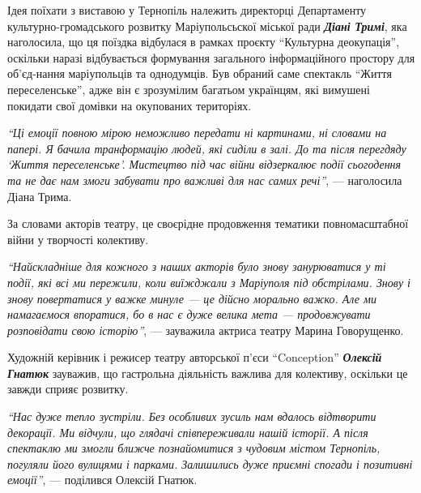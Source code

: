 Ідея поїхати з виставою у Тернопіль належить директорці Департаменту
культурно-громадського розвитку Маріупольсьскої міської ради \emph{\textbf{Діані Тримі}}, яка
наголосила, що ця поїздка відбулася в рамках проєкту \enquote{Культурна деокупація},
оскільки наразі відбувається формування загального інформаційного простору для
об'єд\hyp{}нання маріупольців та однодумців. Був обраний саме спектакль \enquote{Життя
переселенське}, адже він є зрозумілим багатьом українцям, які вимушені покидати
свої домівки на окупованих територіях.

\begin{leftbar}
\emph{\enquote{Ці емоції повною мірою неможливо передати ні картинами, ні словами на
папері. Я бачила транформацію людей, які сиділи в залі. До та після
перегдяду \enquote{Життя переселенське}. Мистецтво під час війни відзеркалює
події сьогодення та не дає нам змоги забувати про важливі для нас самих
речі}}, — наголосила Діана Трима.
\end{leftbar}


За словами акторів театру, це своєрідне продовження тематики повномасштабної
війни у творчості колективу.

\begin{leftbar}
\emph{\enquote{Найскладніше для кожного з наших акторів було знову занурюватися у ті
події, які всі ми пережили, коли виїжджали з Маріуполя під обстрілами.
Знову і знову повертатися у важке минуле — це дійсно морально важко.
Але ми намагаємося впоратися, бо в нас є дуже велика мета —
продовжувати розповідати свою історію}}, — зауважила актриса театру
Марина Говорущенко.
\end{leftbar}

Художній керівник і режисер театру авторської п'єси \enquote{Conception} \textbf{\emph{Олексій Гнатюк}}
зауважив, що гастрольна діяльність важлива для колективу, оскільки це завжди
сприяє розвитку. 


\begin{leftbar}
\emph{\enquote{Нас дуже тепло зустріли. Без особливих зусиль нам вдалось відтворити
декорації. Ми відчули, що глядачі співпереживали нашій історії. А після
спектаклю ми змогли ближче познайомитися з чудовим містом Тернопіль,
погуляли його вулицями і парками. Залишились дуже приємні спогади і
позитивні емоції}}, — поділився Олексій Гнатюк.
\end{leftbar}

